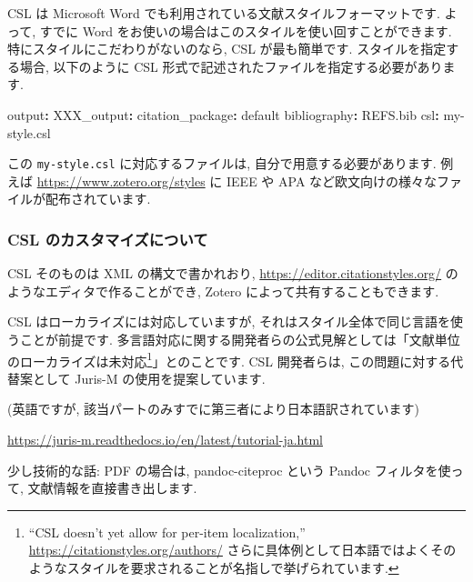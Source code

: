 \documentclass[
]{bxjsarticle}
\newenvironment{Shaded}{\begin{snugshade}}{\end{snugshade}}
\newcommand{\AttributeTok}[1]{\textcolor[rgb]{0.77,0.63,0.00}{#1}}
\newcommand{\FunctionTok}[1]{\textcolor[rgb]{0.00,0.00,0.00}{#1}}
\newcommand{\KeywordTok}[1]{\textcolor[rgb]{0.13,0.29,0.53}{\textbf{#1}}}
\begin{document}
CSL は Microsoft Word でも利用されている文献スタイルフォーマットです. よって, すでに Word をお使いの場合はこのスタイルを使い回すことができます. 特にスタイルにこだわりがないのなら, CSL が最も簡単です. スタイルを指定する場合, 以下のように CSL 形式で記述されたファイルを指定する必要があります.

\begin{Shaded}
\begin{Highlighting}[numbers=left,,]
\FunctionTok{output}\KeywordTok{:}
\AttributeTok{    }\FunctionTok{XXX\_output}\KeywordTok{:}
\AttributeTok{      }\FunctionTok{citation\_package}\KeywordTok{:}\AttributeTok{ default}
\FunctionTok{bibliography}\KeywordTok{:}\AttributeTok{ REFS.bib}
\FunctionTok{csl}\KeywordTok{:}\AttributeTok{ my{-}style.csl}
\end{Highlighting}
\end{Shaded}

この \texttt{my-style.csl} に対応するファイルは, 自分で用意する必要があります. 例えば \url{https://www.zotero.org/styles} に IEEE や APA など欧文向けの様々なファイルが配布されています.

\hypertarget{csl-ux306eux30abux30b9ux30bfux30deux30a4ux30baux306bux3064ux3044ux3066}{%
\subsubsection{CSL のカスタマイズについて}\label{csl-ux306eux30abux30b9ux30bfux30deux30a4ux30baux306bux3064ux3044ux3066}}

CSL そのものは XML の構文で書かれおり, \url{https://editor.citationstyles.org/} のようなエディタで作ることができ, Zotero によって共有することもできます.

CSL はローカライズには対応していますが, それはスタイル全体で同じ言語を使うことが前提です. 多言語対応に関する開発者らの公式見解としては「文献単位のローカライズは未対応\footnote{``CSL doesn't yet allow for per-item localization,'' \url{https://citationstyles.org/authors/} さらに具体例として日本語ではよくそのようなスタイルを要求されることが名指しで挙げられています.}」とのことです. CSL 開発者らは, この問題に対する代替案として Juris-M の使用を提案しています.

(英語ですが, 該当パートのみすでに第三者により日本語訳されています)

\url{https://juris-m.readthedocs.io/en/latest/tutorial-ja.html}

少し技術的な話: PDF の場合は, pandoc-citeproc という Pandoc フィルタを使って, 文献情報を直接書き出します.
\end{document}
